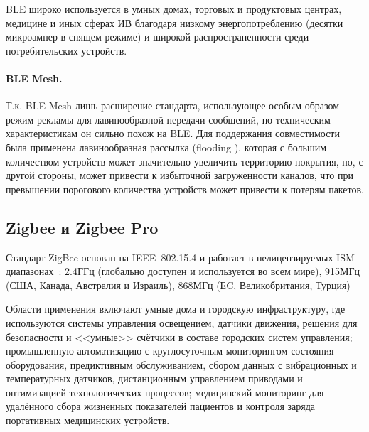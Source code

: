 \documentclass[14pt, a4paper]{extreport}
\begin{document}
BLE широко используется в умных домах, торговых и продуктовых центрах, медицине и иных сферах ИВ благодаря низкому энергопотреблению (десятки микроампер в спящем режиме) и широкой
распространенности среди потребительских устройств.

\paragraph{BLE Mesh.}

Т.к. BLE Mesh лишь расширение стандарта, использующее особым образом режим рекламы для лавинообразной передачи сообщений, по техническим характеристикам он сильно похож на BLE.
Для поддержания совместимости была применена лавинообразная рассылка (flooding \cite{BLE_mesh_spec}), которая с большим количеством устройств может значительно увеличить территорию
покрытия, но, с другой стороны, может привести к избыточной загруженности каналов, что при превышении порогового количества устройств может привести к потерям пакетов.


\subsection{Zigbee и Zigbee Pro}

Стандарт ZigBee основан на IEEE~802.15.4 и работает в нелицензируемых ISM-диапазонах~\cite{IEEE802_15_4_2020,ZIGBEE_SPEC_R23}: 2.4ГГц (глобально доступен и используется во всем мире),
915МГц (США, Канада, Австралия и Израиль),  868МГц (ЕC, Великобритания, Турция)

Области применения включают умные дома и городскую инфраструктуру, где используются системы управления освещением, датчики движения, решения для безопасности и <<умные>> счётчики в
составе городских систем управления; промышленную автоматизацию с круглосуточным мониторингом состояния оборудования, предиктивным обслуживанием, сбором данных с вибрационных и
температурных датчиков, дистанционным управлением приводами и оптимизацией технологических процессов; медицинский мониторинг для удалённого сбора жизненных показателей пациентов и
контроля заряда портативных медицинских устройств.
\end{document}
